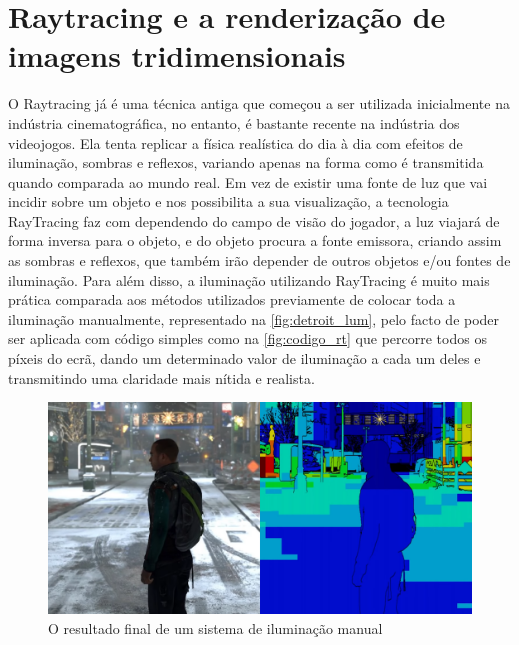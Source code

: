 \documentclass{report}
\begin{document}
\section{Raytracing e a renderização de imagens tridimensionais}
O Raytracing já é uma técnica antiga que começou a ser utilizada inicialmente na indústria cinematográfica, no entanto, é bastante recente na indústria dos videojogos. Ela tenta replicar a física realística do dia à dia com efeitos de iluminação, sombras e reflexos, variando apenas na forma como é transmitida quando comparada ao mundo real. Em vez de existir uma fonte de luz que vai incidir sobre um objeto e nos possibilita a sua visualização, a tecnologia RayTracing faz com dependendo do campo de visão do jogador, a luz viajará de forma inversa para o objeto, e do objeto procura a fonte emissora, criando assim as sombras e reflexos, que também irão depender de outros objetos e/ou fontes de iluminação. \newline \cite{nvidia}
Para além disso, a iluminação utilizando RayTracing é muito mais prática comparada aos métodos utilizados previamente de colocar toda a iluminação manualmente, representado na \autoref{fig:detroit_lum}, pelo facto de poder ser aplicada com código simples como na \autoref{fig:codigo_rt} que percorre todos os píxeis do ecrã, dando um determinado valor de iluminação a cada um deles e transmitindo uma claridade mais nítida e realista. \newline
\begin{figure}[h]
\centering
\includegraphics[width=1\textwidth]{detroit_lum.png}
\caption{O resultado final de um sistema de iluminação manual}
\label{fig:detroit_lum}
\end{figure}
\end{document}
